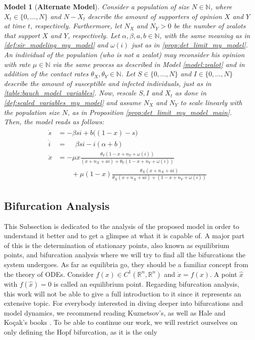\documentclass[12pt,a4paper,twoside]{article}
\newtheorem{model}{Model}[section]
\begin{document}
\begin{model}[\textbf{Alternate Model}]\label{model:my_model}
Consider a population of size $N \in \mathbb{N}$, where $X_t \in \lbrace 0,\dots,N\rbrace$ and $N-X_t$ describe the amount of supporters of opinion $X$ and $Y$ at time $t$, respectively. Furthermore, let $N_X$ and $N_Y > 0$ be the number of zealots that support $X$ and $Y$, respectively. Let $\alpha,\beta,a,b \in \mathbb{N}$, with the same meaning as in \eqref{def:sir_modeling_my_model} and $\omega\left(i\right)$ just as in \eqref{prop:det_limit_my_model}. An individual of the population (who is not a zealot) may reconsider his opinion with rate $\mu \in \mathbb{N}$ via the same process as described in Model \ref{model:zealot} and in addition of the contact rates $\theta_X, \theta_Y \in \mathbb{N}$. Let $S \in \lbrace 0,\dots,N\rbrace$ and $I \in  \lbrace 0,\dots,N\rbrace$ describe the amount of susceptible and infected individuals, just as in \eqref{table:bauch_model_variables}. Now, rescale $S,I$ and $X_t$ as done in \eqref{def:scaled_variables_my_model} and assume $N_X$ and $N_Y$ to scale linearly with the population size $N$, as in Proposition \ref{prop:det_limit_my_model_main}. Then, the model reads as follows:
	\begin{align}
	\begin{split}
	\dot{s} &= -\beta si + b\big(\left(1-x\right) - s\big)\\
	\dot{i} &= \phantom{+}\beta si - i\left(\alpha + b\right)\\
	\dot{x} &= -\mu x\frac{\theta_Y(1-x+n_Y+\omega\left(i\right))}{(x+n_X+ai) + \theta_Y(1-x+n_Y+\omega\left(i\right))}\\
	&\qquad+ \mu \left(1-x\right)\frac{\theta_X (x+ n_X+ ai)}{\theta_X (x + n_X + ai) + (1-x + n_Y + \omega\left(i\right))}
	\end{split}
	\end{align}
\end{model}

\subsection{Bifurcation Analysis}

This Subsection is dedicated to the analysis of the proposed model in order to understand it better and to get a glimpse at what it is capable of. A major part of this is the determination of stationary points, also known as equilibrium points, and bifurcation analysis where we will try to find all the bifurcations the system undergoes. As far as equilibria go, they should be a familiar concept from the theory of \acp{ODE}. Consider $f(x) \in C^1(\mathbb{R}^n,\mathbb{R}^n)$ and $\dot{x} = f(x)$. A point $\hat{x}$ with $f(\hat{x}) = 0$ is called an equilibrium point. Regarding bifurcation analysis, this work will not be able to give a full introduction to it since it represents an extensive topic. For everybody interested in diving deeper into bifurcations and model dynamics, we recommend reading Kuznetsov's, as well as Hale and Ko\c{c}ak's books \cite{Kuznetsov2010, Hale1991}. To be able to continue our work, we will restrict ourselves on only defining the Hopf bifurcation, as it is the only
\end{document}
